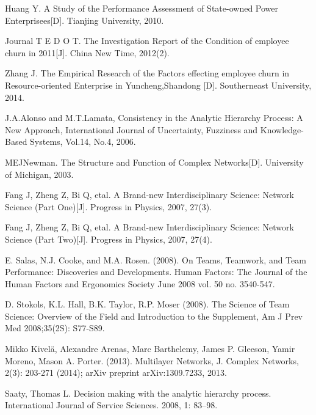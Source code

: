 \documentclass[12pt,a4paper,titlepage]{article}
\begin{document}
\begin{thebibliography}{99}


 Huang Y. A Study of the Performance Assessment of State-owned Power Enterprisees[D]. Tianjing University, 2010.

 Journal T E D O T. The Investigation Report of the Condition of employee churn in 2011[J]. China New Time, 2012(2).

 Zhang J. The Empirical Research of the Factors effecting employee churn in Resource-oriented Enterprise in Yuncheng,Shandong [D]. Southerneast University, 2014.

 J.A.Alonso and M.T.Lamata, Consistency in the Analytic Hierarchy Process: A New Approach, International Journal of Uncertainty, Fuzziness and Knowledge-Based Systems, Vol.14, No.4, 2006.

 MEJNewman. The Structure and Function of Complex Networks[D]. University of Michigan, 2003.

 Fang J, Zheng Z, Bi Q, etal. A Brand-new
Interdisciplinary Science: Network Science (Part One)[J]. Progress in Physics, 2007, 27(3).

 Fang J, Zheng Z, Bi Q, etal. A Brand-new
Interdisciplinary Science: Network Science (Part Two)[J]. Progress in Physics, 2007, 27(4).

 E. Salas, N.J. Cooke, and M.A. Rosen. (2008). On Teams, Teamwork, and Team Performance: Discoveries and Developments. Human Factors: The Journal of the Human Factors and Ergonomics Society June 2008 vol. 50 no. 3540-547.

 D. Stokols, K.L. Hall, B.K. Taylor, R.P. Moser (2008). The Science of Team Science: Overview of the Field and Introduction to the Supplement, Am J Prev Med 2008;35(2S): S77-S89.

 Mikko Kivelä, Alexandre Arenas, Marc Barthelemy, James P. Gleeson, Yamir Moreno, Mason A. Porter. (2013). Multilayer Networks, J. Complex Networks, 2(3): 203-271 (2014); arXiv preprint arXiv:1309.7233, 2013.

 Saaty, Thomas L. Decision making with the analytic hierarchy process. International Journal of Service Sciences. 2008, 1: 83–98.

\end{thebibliography}

\label{LastPage}
\end{document}
